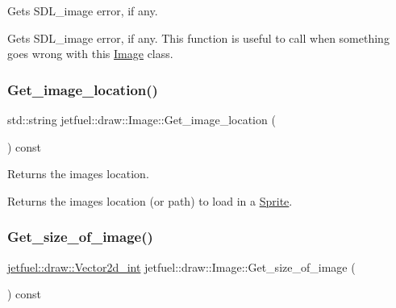 Gets S\+D\+L\+\_\+image error, if any. 

Gets S\+D\+L\+\_\+image error, if any. This function is useful to call when something goes wrong with this \hyperlink{classjetfuel_1_1draw_1_1Image}{Image} class. \mbox{\label{classjetfuel_1_1draw_1_1Image_afe13a343f0ca098c2f258511fa6a2f2b}} 
\subsubsection{\texorpdfstring{Get\+\_\+image\+\_\+location()}{Get\_image\_location()}}
{\footnotesize\ttfamily std\+::string jetfuel\+::draw\+::\+Image\+::\+Get\+\_\+image\+\_\+location (\begin{DoxyParamCaption}{ }\end{DoxyParamCaption}) const\hspace{0.3cm}{\ttfamily [inline]}}



Returns the image\textquotesingle{}s location. 

Returns the image\textquotesingle{}s location (or path) to load in a \hyperlink{classjetfuel_1_1draw_1_1Sprite}{Sprite}. \mbox{\label{classjetfuel_1_1draw_1_1Image_a69eb09128ebcbf427eac516d0c042ce5}} 
\subsubsection{\texorpdfstring{Get\+\_\+size\+\_\+of\+\_\+image()}{Get\_size\_of\_image()}}
{\footnotesize\ttfamily \hyperlink{classjetfuel_1_1draw_1_1Vector2d}{jetfuel\+::draw\+::\+Vector2d\+\_\+int} jetfuel\+::draw\+::\+Image\+::\+Get\+\_\+size\+\_\+of\+\_\+image (\begin{DoxyParamCaption}{ }\end{DoxyParamCaption}) const\hspace{0.3cm}{\ttfamily [inline]}}




